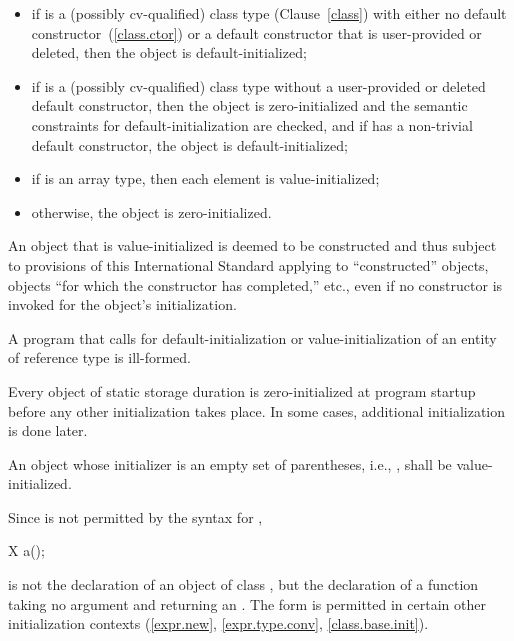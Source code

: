 \begin{itemize}
\item
if
is a (possibly cv-qualified) class type (Clause~\ref{class}) with
either no default constructor~(\ref{class.ctor}) or a default
constructor that is user-provided or deleted, then the object is default-initialized;

\item
if
is a (possibly cv-qualified) class type without a
user-provided or deleted default constructor,
then the object is zero-initialized and the semantic constraints for
default-initialization are checked, and if  has a
non-trivial default constructor, the object is default-initialized;

\item
if
is an array type, then each element is value-initialized;

\item
otherwise, the object is zero-initialized.
\end{itemize}

An object that is value-initialized is deemed to be constructed and thus subject to
provisions of this International Standard applying to ``constructed'' objects, objects
``for which the constructor has completed,'' etc., even if no constructor is invoked
for the object's initialization.

\pnum
A program that calls for default-initialization
or value-initialization
of an entity
of reference type is ill-formed.

\pnum
\begin{note} Every
object of static storage duration is
zero-initialized at program startup before any other initialization
takes place.
In some cases, additional initialization is done later.
\end{note}

\pnum
An object whose initializer is an empty set of parentheses, i.e.,
\tcode{()},
shall be
value-initialized.

%
\begin{note}
Since
\tcode{()}
is not permitted by the syntax for
,

\begin{codeblock}
X a();
\end{codeblock}

is not the declaration of an object of class
,
but the declaration of a function taking no argument and returning an
.
The form
\tcode{()}
is permitted in certain other initialization contexts (\ref{expr.new},
\ref{expr.type.conv}, \ref{class.base.init}).
\end{note}

